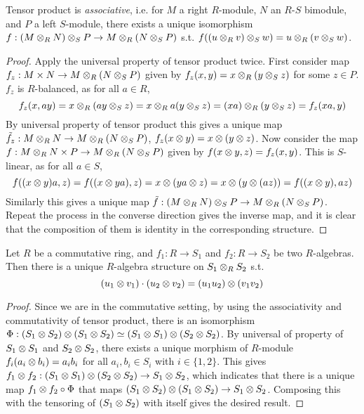 \begin{proposition}
    Tensor product is \emph{associative}, i.e. for $M$ a right $R$-module, $N$ an $R$-$S$ bimodule, and $P$ a left $S$-module, there exists a unique isomorphism $f: (M \otimes_R N) \otimes_S P \to M \otimes_R (N \otimes_S P)$ s.t. $f((u \otimes_R v) \otimes_S w) = u \otimes_R (v \otimes_S w)$.
\end{proposition}

\begin{proof}
    Apply the universal property of tensor product twice. First consider map $f_z: M \times N \to M \otimes_R (N \otimes_S P)$ given by $f_z(x, y) = x \otimes_R (y \otimes_S z)$ for some $z \in P$. $f_z$ is $R$-balanced, as for all $a \in R$, 
    \[
        f_z(x, ay) = x\otimes_R (ay \otimes_S z) = x \otimes_R a(y \otimes_S z) = (xa) \otimes_R (y \otimes_S z) = f_z(xa, y)
    \]
    By universal property of tensor product this gives a unique map $\tilde{f_z}: M \otimes_R N \to M \otimes_R (N \otimes_S P)$, $f_z(x \otimes y) = x \otimes (y \otimes z)$. Now consider the map $f: M \otimes_R N \times P \to M \otimes_R (N \otimes_S P)$ given by $f(x \otimes y, z) = f_z(x, y)$. This is $S$-linear, as for all $a \in S$,
    \[
        f((x \otimes y)a, z) = f((x \otimes ya), z) = x \otimes (ya \otimes z) = x \otimes (y \otimes (az)) = f((x \otimes y), az)
    \]
    Similarly this gives a unique map $\tilde{f}: (M \otimes_R N) \otimes_S P \to M \otimes_R (N \otimes_S P)$. Repeat the process in the converse direction gives the inverse map, and it is clear that the composition of them is identity in the corresponding structure.
\end{proof}

\begin{proposition}
    Let $R$ be a commutative ring, and $f_1: R \to S_1$ and $f_2: R \to S_2$ be two $R$-algebras. Then there is a unique $R$-algebra structure on $S_1 \otimes_R S_2$ s.t. 
    \[
        (u_1 \otimes v_1) \cdot (u_2 \otimes v_2) = (u_1 u_2) \otimes (v_1 v_2)
    \]
\end{proposition}

\begin{proof}
    Since we are in the commutative setting, by using the associativity and commutativity of tensor product, there is an isomorphism $\Phi: (S_1 \otimes S_2) \otimes (S_1 \otimes S_2) \simeq (S_1 \otimes S_1) \otimes (S_2 \otimes S_2)$. By universal of property of $S_1 \otimes S_1$ and $S_2 \otimes S_2$, there exists a unique morphism of $R$-module $f_i(a_i \otimes b_i) = a_i b_i$ for all $a_i, b_i \in S_i$ with $i\in \{1, 2\}$. This gives $f_1 \otimes f_2: (S_1 \otimes S_1) \otimes (S_2 \otimes S_2) \to S_1 \otimes S_2$, which indicates that there is a unique map $f_1 \otimes f_2 \circ \Phi$ that maps $(S_1 \otimes S_2) \otimes (S_1 \otimes S_2) \to S_1 \otimes S_2$. Composing this with the tensoring of $(S_1 \otimes S_2)$ with itself gives the desired result.
\end{proof}

